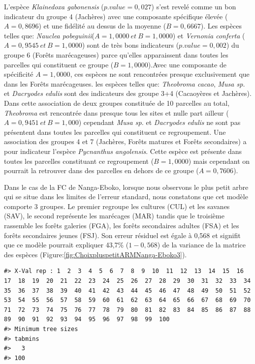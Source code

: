 \documentclass[
  12pt,
  a4paper,
  extrafontsizes,
  onecolumn,
  openright]{book}
\theoremstyle{definition}
\theoremstyle{definition}
\theoremstyle{definition}
\theoremstyle{definition}
\theoremstyle{remark}
\begin{document}
L'espèce \emph{Klainedoxa gabonensis} (\(p.value=0,027\)) s'est revelé comme un bon indicateur du groupe 4 (Jachères) avec une composante spécifique élevée (\(A=0,8696\)) et une fidélité au dessus de la moyenne (\(B=0,6667\)). Les espèces telles que: \emph{Nauclea pobeguinii}(\(A=1,0000\ et\ B=1,0000\)) et \emph{Vernonia conferta} (\(A=0,9545\ et\ B=1,0000\)) sont de très bons indicateurs (\(p.value=0,002\)) du groupe 6 (Forêts marécageuses) parce qu'elles apparaissent dans toutes les parcelles qui constituent ce groupe (\(B=1,0000\)).Avec une composante de spécificité \(A=1,0000\), ces espèces ne sont rencontrées presque exclusivement que dans les Forêts marécageuses. les espèces telles que: \emph{Theobroma cacao}, \emph{Musa sp.} et \emph{Dacryodes edulis} sont des indicateurs des groupe 3+4 (Cacaoyères et Jachères). Dans cette association de deux groupes constituée de 10 parcelles au total, \emph{Theobroma} est rencontrée dans presque tous les sites et nulle part ailleur (\(A=0,9451\ et\ B=1,000\)) cependant \emph{Musa sp.} et \emph{Dacryodes edulis} ne sont pas présentent dans toutes les parcelles qui constituent ce regroupement. Une association des groupes 4 et 7 (Jachères, Forêts matures et Forêts secondaires) a pour indicateur l'espèce \emph{Pycnanthus angolensis}. Cette espèce est présente dans toutes les parcelles constituant ce regroupement (\(B=1,0000\)) mais cependant on pourrait la retrouver dans des parcelles en dehors de ce groupe (\(A=0,7606\)).

Dans le cas de la FC de Nanga-Eboko, lorsque nous observons le plus petit arbre qui se situe dans les limites de l'erreur standard, nous constatons que cet modèle comporte 3 groupes. Le premier regroupe les cultures (CUL) et les savanes (SAV), le second représente les marécages (MAR) tandis que le troisième rassemble les forêts galeries (FGA), les forêts secondaires adultes (FSA) et les forêts secondaires jeunes (FSJ). Son erreur résiduel est égale à 0,568 et signifit que ce modèle pourrait expliquer 43,7\% (\(1-0,568\)) de la variance de la matrice des espèces (Figure:\ref{fig:ChoixpluspetitARMNanga-Eboko3}).

\begin{verbatim}
#> X-Val rep : 1  2  3  4  5  6  7  8  9  10  11  12  13  14  15  16  17  18  19  20  21  22  23  24  25  26  27  28  29  30  31  32  33  34  35  36  37  38  39  40  41  42  43  44  45  46  47  48  49  50  51  52  53  54  55  56  57  58  59  60  61  62  63  64  65  66  67  68  69  70  71  72  73  74  75  76  77  78  79  80  81  82  83  84  85  86  87  88  89  90  91  92  93  94  95  96  97  98  99  100
#> Minimum tree sizes
#> tabmins
#>   3 
#> 100
\end{verbatim}
\end{document}
